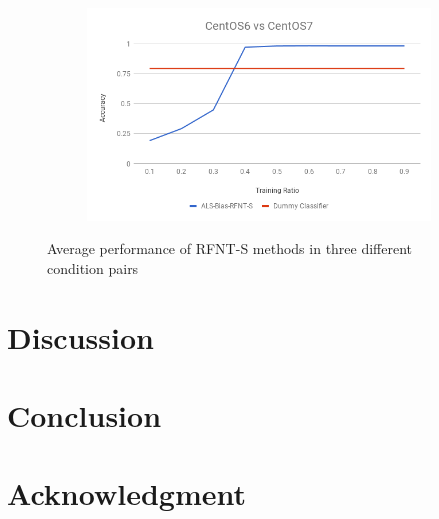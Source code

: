 \documentclass[10pt, conference, compsocconf]{IEEEtran}
\begin{document}
\begin{figure}[h!]
\begin{subfigure}[b]{0.8\linewidth}
                \includegraphics[width=\columnwidth]{figures/ALS-Bias/RFNT-S-ALS-Bias-6vs7-PFS}
        \end{subfigure}
        \caption{Average performance of RFNT-S methods in three different condition pairs}
        \label{fig:RFNT-S method}
\end{figure}


\section{Discussion}






\section{Conclusion}


\section*{Acknowledgment}



\end{document}
